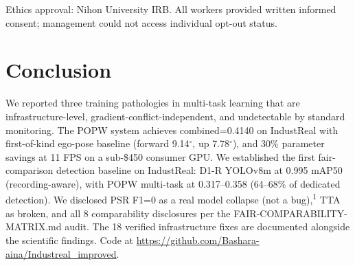 \documentclass[conference]{IEEEtran}
\newcommand{\popw}{POPW}
\newcommand{\industreal}{IndustReal}
\begin{document}
Ethics approval: Nihon University IRB. All workers provided written informed consent; management could not access individual opt-out status.

\section{Conclusion}
\label{sec:conclusion}

We reported three training pathologies in multi-task learning that are infrastructure-level, gradient-conflict-independent, and undetectable by standard monitoring. The \popw{} system achieves combined=0.4140 on \industreal{} with first-of-kind ego-pose baseline (forward 9.14$^\circ$, up 7.78$^\circ$), and 30\% parameter savings at 11 FPS on a sub-\$450 consumer GPU. We established the first fair-comparison detection baseline on \industreal: D1-R YOLOv8m at 0.995 mAP50 (recording-aware), with POPW multi-task at 0.317--0.358 (64--68\% of dedicated detection). We disclosed PSR F1=0 as a real model collapse (not a bug),\textsuperscript{1} TTA as broken, and all 8 comparability disclosures per the FAIR-COMPARABILITY-MATRIX.md audit. The 18 verified infrastructure fixes are documented alongside the scientific findings. Code at \url{https://github.com/Bashara-aina/Industreal_improved}.
\end{document}
